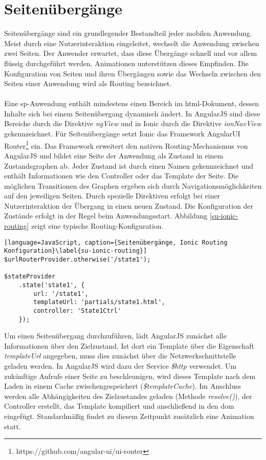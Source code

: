 \section{Seitenübergänge}
\label{pt-main}

Seitenübergänge sind ein grundlegender Bestandteil jeder mobilen Anwendung. Meist durch eine Nutzerinteraktion eingeleitet, wechselt die Anwendung zwischen zwei Seiten. Der Anwender erwartet, dass diese Übergänge schnell und vor allem flüssig durchgeführt werden. Animationen unterstützen dieses Empfinden. Die Konfiguration von Seiten und ihren Übergängen sowie das Wechseln zwischen den Seiten einer Anwendung wird als Routing bezeichnet. 
\\\\
Eine \gls{sp}-Anwendung enthält mindestens einen Bereich im \gls{html}-Dokument, dessen Inhalte sich bei einem Seitenübergang dynamisch ändert. In AngularJS sind diese Bereiche durch die Direktive \emph{ngView} und in Ionic durch die Direktive \emph{ionNavView} gekennzeichnet. Für Seitenübergänge setzt Ionic das Framework AngularUI Router\footnote{https://github.com/angular-ui/ui-router} ein. Das Framework erweitert den nativen Routing-Mechanismus von AngularJS und bildet eine Seite der Anwendung als Zustand in einem Zustandsgraphen ab. Jeder Zustand ist durch einen Namen gekennzeichnet und enthält Informationen wie den Controller oder das Template der Seite. Die möglichen Transitionen des Graphen ergeben sich durch Navigationsmöglichkeiten auf den jeweiligen Seiten. Durch spezielle Direktiven erfolgt bei einer Nutzerinteraktion der Übergang in einen neuen Zustand. Die Konfiguration der Zustände erfolgt in der Regel beim Anwendungsstart. Abbildung \ref{su-ionic-routing} zeigt eine typische Routing-Konfiguration.
\begin{lstlisting}[language=JavaScript, caption={Seitenübergänge, Ionic Routing Konfiguration}\label{su-ionic-routing}]
$urlRouterProvider.otherwise('/state1');

$stateProvider
	.state('state1', {
		url: '/state1',
		templateUrl: 'partials/state1.html',
		controller: 'State1Ctrl'
	});	
\end{lstlisting}
Um einen Seitenübergang durchzuführen, lädt AngularJS zunächst alle Informationen über den Zielzustand. Ist dort ein Template über die Eigenschaft \emph{templateUrl} angegeben, muss dies zunächst über die Netzwerkschnittstelle geladen werden. In AngularJS wird dazu der Service \emph{\$http} verwendet. Um zukünftige Aufrufe einer Seite zu beschleunigen, wird dieses Template nach dem Laden in einem Cache zwischengespeichert (\emph{\$templateCache}). Im Anschluss werden alle Abhängigkeiten des Zielzustandes geladen (Methode \emph{resolve()}), der Controller erstellt, das Template kompiliert und anschließend in den \gls{dom} eingefügt. Standardmäßig findet zu diesem Zeitpunkt zusätzlich eine Animation statt.   
